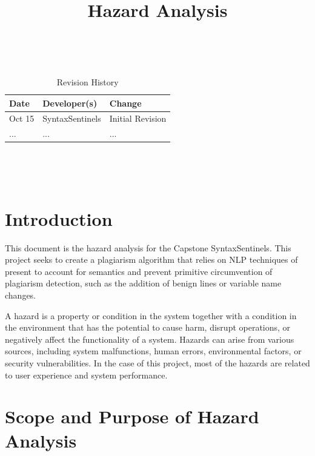 \documentclass{article}
\title{Hazard Analysis\\\progname}
\author{\authname}
\date{}
\begin{document}
\maketitle
\thispagestyle{empty}

~\newpage


\begin{table}[hp]
\caption*{Revision History} \label{TblRevisionHistory}
\begin{tabularx}{\textwidth}{llX}
\toprule
\textbf{Date} & \textbf{Developer(s)} & \textbf{Change}\\
\midrule
Oct 15 & SyntaxSentinels & Initial Revision\\
... & ... & ...\\
\bottomrule
\end{tabularx}
\end{table}

~\newpage

\tableofcontents

\listoftables

~\newpage



\section{Introduction}

This document is the hazard analysis for the Capstone SyntaxSentinels. This project seeks to create a plagiarism algorithm that relies on NLP
techniques of present to account for semantics and prevent primitive circumvention of plagiarism detection, such as the addition of benign lines or
variable name changes.

A hazard is a property or condition in the system together with a condition in the environment that has the potential to cause harm, disrupt operations, 
or negatively affect the functionality of a system. Hazards can arise from various sources, including system  malfunctions, human errors, environmental 
factors, or security vulnerabilities. In the case of this project, most of the hazards are related to user experience and system performance.

\section{Scope and Purpose of Hazard Analysis}
\end{document}
